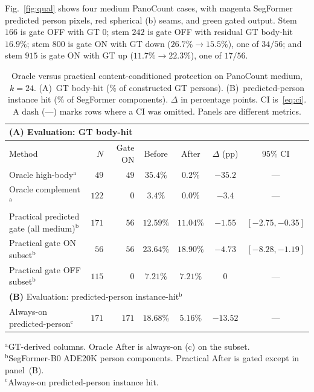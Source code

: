 Fig.~\ref{fig:qual} shows four medium PanoCount cases, with
magenta SegFormer predicted person pixels, red spherical (b)
seams, and green gated output. Stem $166$ is gate OFF with GT
$0$; stem $242$ is gate OFF with residual GT body-hit $16.9\%$;
stem $800$ is gate ON with GT down ($26.7\%\rightarrow 15.5\%$),
one of $34/56$; and stem $915$ is gate ON with GT up
($11.7\%\rightarrow 22.3\%$), one of $17/56$.

\begin{table}[t]
\centering
\caption{Oracle versus practical content-conditioned protection
on PanoCount medium, $k=24$. (A)~GT body-hit (\% of constructed
GT persons). (B)~predicted-person instance hit (\% of SegFormer
components). $\Delta$ in percentage points. CI is~\eqref{eq:ci}.
A dash (---) marks rows where a CI was omitted. Panels are different
metrics.}
\label{tab:conditioned}
\label{tab:body-boundary}
\label{tab:practical-gate}
\setlength{\tabcolsep}{2.8pt}
\scriptsize
\begin{tabular}{l r r c c c c}
\toprule
\multicolumn{7}{l}{\textbf{(A)} Evaluation: GT body-hit} \\
\midrule
Method & $N$ & Gate ON & Before & After & $\Delta$ (pp) & $95\%$ CI \\
\midrule
Oracle high-body$^{\mathrm{a}}$ & $49$ & $49$ & $35.4\%$ & $0.2\%$ & $-35.2$ & --- \\
Oracle complement$^{\mathrm{a}}$ & $122$ & $0$ & $3.4\%$ & $0.0\%$ & $-3.4$ & --- \\
Practical predicted gate (all medium)$^{\mathrm{b}}$ & $171$ & $56$ & $12.59\%$ & $11.04\%$ & $-1.55$ & $[-2.75,-0.35]$ \\
Practical gate ON subset$^{\mathrm{b}}$ & $56$ & $56$ & $23.64\%$ & $18.90\%$ & $-4.73$ & $[-8.28,-1.19]$ \\
Practical gate OFF subset$^{\mathrm{b}}$ & $115$ & $0$ & $7.21\%$ & $7.21\%$ & $0$ & --- \\
\midrule
\multicolumn{7}{l}{\textbf{(B)} Evaluation: predicted-person instance-hit$^{\mathrm{b}}$} \\
\midrule
Always-on predicted-person$^{\mathrm{c}}$ & $171$ & $171$ & $18.68\%$ & $5.16\%$ & $-13.52$ & --- \\
\bottomrule
\end{tabular}

\vspace{4pt}
\begin{minipage}{\linewidth}
\raggedright\scriptsize
$^{\mathrm{a}}$GT-derived columns. Oracle After is always-on (c)
on the subset.\\
$^{\mathrm{b}}$SegFormer-B0 ADE20K person components. Practical
After is gated except in panel~(B).\\
$^{\mathrm{c}}$Always-on predicted-person instance hit.
\end{minipage}
\end{table}

